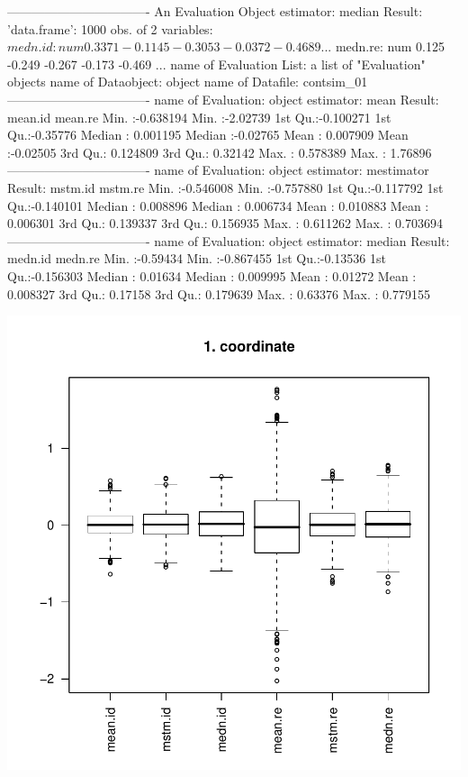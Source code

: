 \documentclass[11pt]{article}
\begin{document}
\begin{Schunk}
\begin{Soutput}
----------------------------------
An Evaluation Object
estimator: median
Result: 'data.frame':	1000 obs. of  2 variables:
 $ medn.id: num   0.3371 -0.1145 -0.3053 -0.0372 -0.4689 ...
 $ medn.re: num   0.125 -0.249 -0.267 -0.173 -0.469 ...
name of Evaluation List: a list of "Evaluation" objects
name of Dataobject: object
name of Datafile: contsim_01
----------------------------------
name of Evaluation: object
estimator: mean
Result:
    mean.id             mean.re        
 Min.   :-0.638194   Min.   :-2.02739  
 1st Qu.:-0.100271   1st Qu.:-0.35776  
 Median : 0.001195   Median :-0.02765  
 Mean   : 0.007909   Mean   :-0.02505  
 3rd Qu.: 0.124809   3rd Qu.: 0.32142  
 Max.   : 0.578389   Max.   : 1.76896  
----------------------------------
name of Evaluation: object
estimator: mestimator
Result:
    mstm.id             mstm.re         
 Min.   :-0.546008   Min.   :-0.757880  
 1st Qu.:-0.117792   1st Qu.:-0.140101  
 Median : 0.008896   Median : 0.006734  
 Mean   : 0.010883   Mean   : 0.006301  
 3rd Qu.: 0.139337   3rd Qu.: 0.156935  
 Max.   : 0.611262   Max.   : 0.703694  
----------------------------------
name of Evaluation: object
estimator: median
Result:
    medn.id            medn.re         
 Min.   :-0.59434   Min.   :-0.867455  
 1st Qu.:-0.13536   1st Qu.:-0.156303  
 Median : 0.01634   Median : 0.009995  
 Mean   : 0.01272   Mean   : 0.008327  
 3rd Qu.: 0.17158   3rd Qu.: 0.179639  
 Max.   : 0.63376   Max.   : 0.779155  
\end{Soutput}
\end{Schunk}
\includegraphics{distr-elist}
\end{document}
